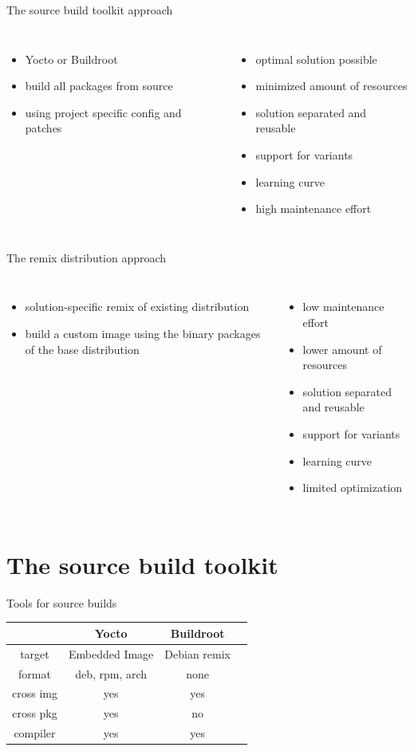 \documentclass{beamer}
\newcommand\pro{\item[$+$]}
\newcommand\con{\item[$-$]}
\begin{document}
\begin{frame}{The source build toolkit approach}
	\begin{columns}
        \centering
        \begin{itemize}
        		\item Yocto or Buildroot
        		\item build all packages from source
        		\item using project specific config and patches
        \end{itemize}
        \centering
        \begin{itemize}
        		\pro optimal solution possible
        		\pro minimized amount of resources
        		\pro solution separated and reusable
        		\pro support for variants
        		\con learning curve
        		\con high maintenance effort
        \end{itemize}
    \end{columns}
\end{frame}

\begin{frame}{The remix distribution approach}
	\begin{columns}
		\centering
		\begin{itemize}
			\item solution-specific remix of existing distribution
			\item build a custom image using the binary packages of the base distribution
		\end{itemize}
		\centering
		\begin{itemize}
			\pro low maintenance effort
			\pro lower amount of resources
			\pro solution separated and reusable
			\pro support for variants
			\con learning curve
			\con limited optimization
		\end{itemize}
	\end{columns}
\end{frame}

\section{The source build toolkit}

\begin{frame}{Tools for source builds}
	\begin{tabular}{c|ccc}
		& \textbf{Yocto} & \textbf{Buildroot}  \\
		\hline
		target & Embedded Image & Debian remix \\ 
		format & deb, rpm, arch & none \\
		cross img & yes & yes \\
		cross pkg & yes & no \\
		compiler & yes & yes \\
	\end{tabular}
\end{frame}
\end{document}
